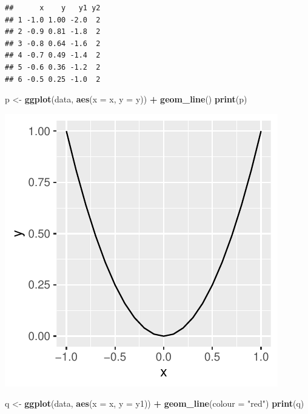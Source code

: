 \documentclass[]{book}
\newenvironment{Shaded}{\begin{snugshade}}{\end{snugshade}}
\newcommand{\DataTypeTok}[1]{\textcolor[rgb]{0.13,0.29,0.53}{#1}}
\newcommand{\KeywordTok}[1]{\textcolor[rgb]{0.13,0.29,0.53}{\textbf{#1}}}
\newcommand{\NormalTok}[1]{#1}
\newcommand{\OperatorTok}[1]{\textcolor[rgb]{0.81,0.36,0.00}{\textbf{#1}}}
\newcommand{\StringTok}[1]{\textcolor[rgb]{0.31,0.60,0.02}{#1}}
\begin{document}
\begin{verbatim}
##      x    y   y1 y2
## 1 -1.0 1.00 -2.0  2
## 2 -0.9 0.81 -1.8  2
## 3 -0.8 0.64 -1.6  2
## 4 -0.7 0.49 -1.4  2
## 5 -0.6 0.36 -1.2  2
## 6 -0.5 0.25 -1.0  2
\end{verbatim}

\begin{Shaded}
\begin{Highlighting}[]
\NormalTok{p <-}\StringTok{ }\KeywordTok{ggplot}\NormalTok{(data, }\KeywordTok{aes}\NormalTok{(}\DataTypeTok{x =}\NormalTok{ x, }\DataTypeTok{y =}\NormalTok{ y)) }\OperatorTok{+}
\StringTok{  }\KeywordTok{geom_line}\NormalTok{()}
\KeywordTok{print}\NormalTok{(p)}
\end{Highlighting}
\end{Shaded}

\includegraphics{bookdown-demo_files/figure-latex/unnamed-chunk-10-1.pdf}

\begin{Shaded}
\begin{Highlighting}[]
\NormalTok{q <-}\StringTok{ }\KeywordTok{ggplot}\NormalTok{(data, }\KeywordTok{aes}\NormalTok{(}\DataTypeTok{x =}\NormalTok{ x, }\DataTypeTok{y =}\NormalTok{ y1)) }\OperatorTok{+}
\StringTok{  }\KeywordTok{geom_line}\NormalTok{(}\DataTypeTok{colour =} \StringTok{"red"}\NormalTok{)}
\KeywordTok{print}\NormalTok{(q)}
\end{Highlighting}
\end{Shaded}
\end{document}
